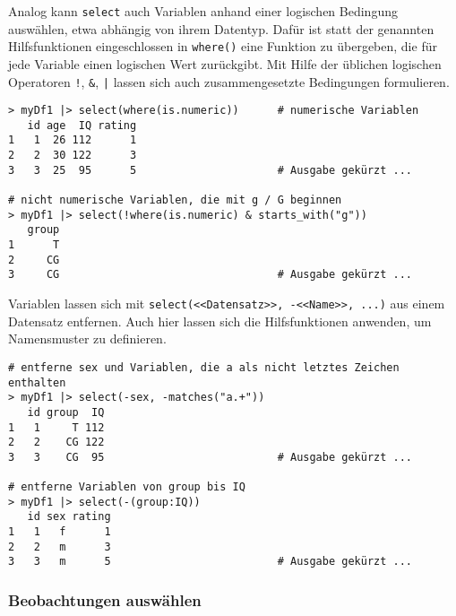 Analog kann \lstinline!select! auch Variablen anhand einer logischen Bedingung auswählen, etwa abhängig von ihrem Datentyp. Dafür ist statt der genannten Hilfsfunktionen eingeschlossen in \lstinline!where()! eine Funktion zu übergeben, die für jede Variable einen logischen Wert zurückgibt. Mit Hilfe der üblichen logischen Operatoren \lstinline|!|, \lstinline!&!, \lstinline!|! lassen sich auch zusammengesetzte Bedingungen formulieren.
\begin{lstlisting}
> myDf1 |> select(where(is.numeric))      # numerische Variablen
   id age  IQ rating
1   1  26 112      1
2   2  30 122      3
3   3  25  95      5                      # Ausgabe gekürzt ...

# nicht numerische Variablen, die mit g / G beginnen
> myDf1 |> select(!where(is.numeric) & starts_with("g"))
   group
1      T
2     CG
3     CG                                  # Ausgabe gekürzt ...
\end{lstlisting}

Variablen lassen sich mit \lstinline!select(<<Datensatz>>, -<<Name>>, ...)! aus einem Datensatz entfernen. Auch hier lassen sich die Hilfsfunktionen anwenden, um Namensmuster zu definieren.
\begin{lstlisting}
# entferne sex und Variablen, die a als nicht letztes Zeichen enthalten
> myDf1 |> select(-sex, -matches("a.+"))
   id group  IQ
1   1     T 112
2   2    CG 122
3   3    CG  95                           # Ausgabe gekürzt ...

# entferne Variablen von group bis IQ
> myDf1 |> select(-(group:IQ))
   id sex rating
1   1   f      1
2   2   m      3
3   3   m      5                          # Ausgabe gekürzt ...
\end{lstlisting}

\subsubsection{Beobachtungen auswählen}

